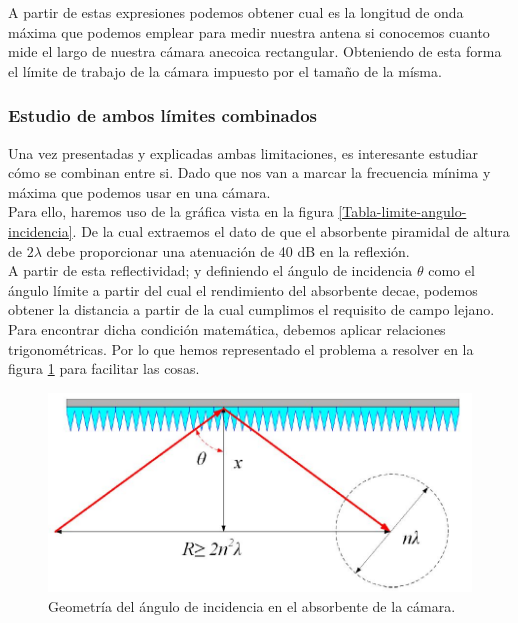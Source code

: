 \documentclass{article}
\begin{document}
A partir de estas expresiones podemos obtener cual es la longitud de onda máxima que podemos emplear para medir nuestra antena si conocemos cuanto mide el largo de nuestra cámara anecoica rectangular. Obteniendo de esta forma el límite de trabajo de la cámara impuesto por el tamaño de la mísma. 

\newpage

\subsubsection{Estudio de ambos límites combinados}

Una vez presentadas y explicadas ambas limitaciones, es interesante estudiar cómo se combinan entre si. Dado que nos van a marcar la frecuencia mínima y máxima que podemos usar en una cámara. 
\\

Para ello, haremos uso de la gráfica vista en la figura \ref{Tabla-limite-angulo-incidencia}. De la cual extraemos el dato de que el absorbente piramidal de altura de $2\lambda$ debe proporcionar una atenuación de 40 dB en la reflexión. 
\\

A partir de esta reflectividad; y definiendo el ángulo de incidencia $\theta$ como el ángulo límite a partir del cual el rendimiento del absorbente decae, podemos obtener la distancia a partir de la cual cumplimos el requisito de campo lejano.\\
Para encontrar dicha condición matemática, debemos aplicar relaciones trigonométricas. Por lo que hemos representado el problema a resolver en la figura \ref{Geometría-del-ángulo-incidencia-absorvente} para facilitar las cosas. 

\begin{figure}[h]
    \centering
    \includegraphics[scale=0.65]{Figura2-Geometria del angulo incidencia}
    \caption{Geometría del ángulo de incidencia en el absorbente de la cámara.}
    \label{Geometría-del-ángulo-incidencia-absorvente}
\end{figure}
\end{document}
